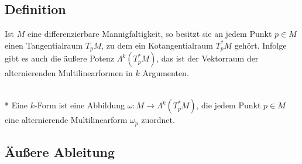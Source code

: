 \subsection{Definition}

Ist $M$ eine differenzierbare Mannigfaltigkeit, so besitzt sie an
jedem Punkt $p\in M$ einen Tangentialraum $T_p M$, zu dem ein
Kotangentialraum $T_p^* M$ gehört. Infolge gibt es auch die
äußere Potenz $\Lambda^k(T_p^* M)$, das ist der Vektorraum der
alternierenden Multilinearformen in $k$ Argumenten.

\begin{definition}[Differentialform]\mbox{}\\*
Eine $k$-Form ist eine Abbildung
$\omega\colon M\to \Lambda^k(T_p^* M)$,
die jedem Punkt $p\in M$ eine alternierende Multilinearform
$\omega_p$ zuordnet.
\end{definition}

\subsection{Äußere Ableitung}


